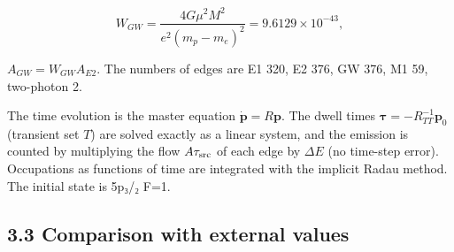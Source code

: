 \documentclass[
  a4paper,
]{article}
\begin{document}
\[
W_{GW}=\frac{4G\mu^2M^2}{e^2(m_p-m_e)^2}=9.6129\times10^{-43},
\]

\(A_{GW}=W_{GW}A_{E2}\). The numbers of edges are E1 320, E2 376, GW
376, M1 59, two-photon 2.

The time evolution is the master equation
\(\dot{\mathbf p}=R\mathbf p\). The dwell times
\(\boldsymbol\tau=-R_{TT}^{-1}\mathbf p_0\) (transient set \(T\)) are
solved exactly as a linear system, and the emission is counted by
multiplying the flow \(A\tau_{\rm src}\) of each edge by \(\Delta E\)
(no time-step error). Occupations as functions of time are integrated
with the implicit Radau method. The initial state is 5p₃/₂ F=1.

\subsection{3.3 Comparison with external
values}\label{comparison-with-external-values}
\end{document}
